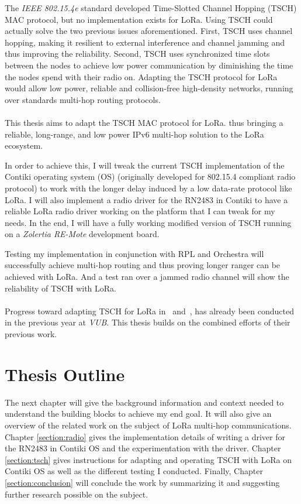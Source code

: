The \emph{IEEE 802.15.4e} standard developed Time-Slotted Channel Hopping
(TSCH) MAC protocol, but no implementation exists for LoRa.
Using TSCH could actually solve the two previous issues aforementioned.
First, TSCH uses channel hopping, making it resilient to external interference and
channel jamming and thus improving the reliability.
Second, TSCH uses synchronized time slots between the nodes to achieve low
power communication by diminishing the time the nodes spend with their radio
on.
Adapting the TSCH protocol for LoRa would allow low power,
reliable and collision-free high-density networks, running over standards
multi-hop routing protocols.

\paragraph{}

This thesis aims to adapt the TSCH MAC protocol for LoRa.
thus bringing a reliable, long-range, and low power IPv6 multi-hop
solution to the LoRa ecosystem.

In order to achieve this, I will tweak the current TSCH implementation of
the Contiki operating system (OS) (originally developed for 802.15.4 compliant radio protocol)
to work with the longer delay induced by a low data-rate protocol like LoRa.
I will also implement a radio driver for the RN2483 in Contiki to have a
reliable LoRa radio driver working on the platform that I can tweak for my
needs.
In the end, I will have a fully working modified version of TSCH running on a
\emph{Zolertia RE-Mote} development board.

Testing my implementation in conjunction with RPL and Orchestra will successfully
achieve multi-hop routing and thus proving longer ranger can be achieved with
LoRa.
And a test ran over a jammed radio channel will show the reliability of
TSCH with LoRa.

\paragraph{}

Progress toward adapting TSCH for LoRa in~\cite{8847137} and~\cite{njomgang_2018},
has already been conducted in the previous year at \emph{VUB}.
This thesis builds on the combined efforts of their previous work.

\section{Thesis Outline}

The next chapter will give the background information and context needed to
understand the building blocks to achieve my end goal.
It will also give an overview of the related work on the subject of
LoRa multi-hop communications.
Chapter \ref{section:radio} gives the implementation details of writing a driver for the
RN2483 in Contiki OS and the experimentation with the driver.
Chapter \ref{section:tsch} gives instructions for adapting and operating TSCH with LoRa on
Contiki OS as well as the different testing I conducted.
Finally, Chapter \ref{section:conclusion} will conclude the work by summarizing it and suggesting
further research possible on the subject.
